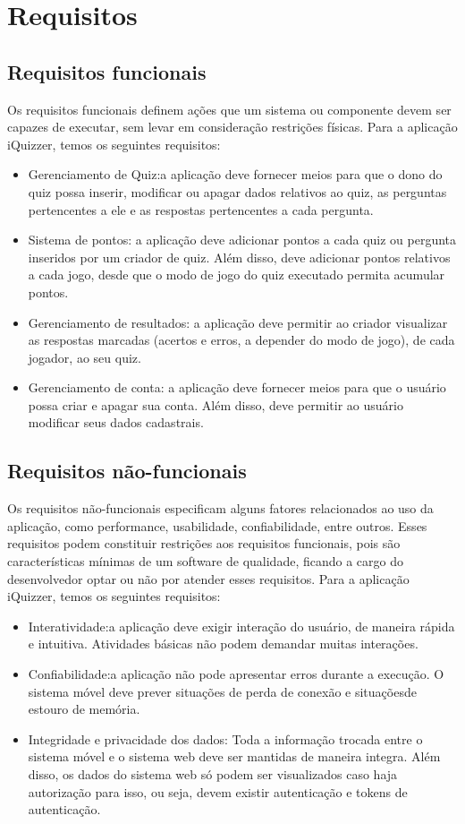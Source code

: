 \section{Requisitos}
 
\subsection{Requisitos funcionais}
Os requisitos funcionais definem ações que um sistema ou componente devem ser capazes de executar, sem levar em consideração restrições físicas. Para a aplicação iQuizzer, temos os seguintes requisitos:
\begin{itemize}
\item Gerenciamento de Quiz:a aplicação deve fornecer meios para que o dono do quiz possa inserir, modificar ou apagar dados relativos ao quiz, as perguntas pertencentes a ele e as respostas pertencentes a cada pergunta.
\item Sistema de pontos: a aplicação deve adicionar pontos a cada quiz ou pergunta inseridos por um criador de quiz. Além disso, deve adicionar pontos relativos a cada jogo, desde que o modo de jogo do quiz executado permita acumular pontos.
\item Gerenciamento de resultados: a aplicação deve permitir ao criador visualizar as respostas marcadas (acertos e erros, a depender do modo de jogo), de cada jogador, ao seu quiz.
\item Gerenciamento de conta: a aplicação deve fornecer meios para que o usuário possa criar e apagar sua conta. Além disso, deve permitir ao usuário modificar seus dados cadastrais.
\end{itemize} 
 
\subsection{Requisitos não-funcionais}
Os requisitos não-funcionais especificam alguns fatores relacionados ao uso da aplicação, como performance, usabilidade, confiabilidade, entre outros. Esses requisitos podem constituir restrições aos requisitos funcionais, pois são características mínimas de um software de qualidade, ficando a cargo do desenvolvedor optar ou não por atender esses requisitos.  Para a aplicação iQuizzer, temos os seguintes requisitos:
\begin{itemize}
\item Interatividade:a aplicação deve exigir interação do usuário, de maneira rápida e intuitiva. Atividades básicas não podem demandar muitas interações.
\item Confiabilidade:a aplicação não pode apresentar erros durante a execução. O sistema móvel deve prever situações de perda de conexão e situaçõesde estouro de memória.
\item Integridade e privacidade dos dados: Toda a informação trocada entre o sistema móvel e o sistema web deve ser mantidas de maneira integra. Além disso, os dados do sistema web só podem ser visualizados caso haja autorização para isso, ou seja, devem existir autenticação e tokens de autenticação.
\end{itemize} 
